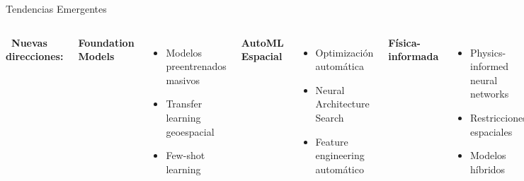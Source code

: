 \documentclass[10pt,aspectratio=169]{beamer}
\begin{document}
\begin{frame}{Tendencias Emergentes}
    \begin{columns}
        \textbf{\faRocket\ Nuevas direcciones:}

        \vspace{2mm}
        \colorbox{blue!20}{\textbf{Foundation Models}}
        \begin{itemize}
            \item Modelos preentrenados masivos
            \item Transfer learning geoespacial
            \item Few-shot learning
        \end{itemize}

        \vspace{2mm}
        \colorbox{green!20}{\textbf{AutoML Espacial}}
        \begin{itemize}
            \item Optimización automática
            \item Neural Architecture Search
            \item Feature engineering automático
        \end{itemize}

        \vspace{2mm}
        \colorbox{red!20}{\textbf{Física-informada}}
        \begin{itemize}
            \item Physics-informed neural networks
            \item Restricciones espaciales
            \item Modelos híbridos
        \end{itemize}

        \textbf{\faBrain\ IA Generativa Espacial:}

        \vspace{3mm}
\end{columns}
\end{frame}
\end{document}
